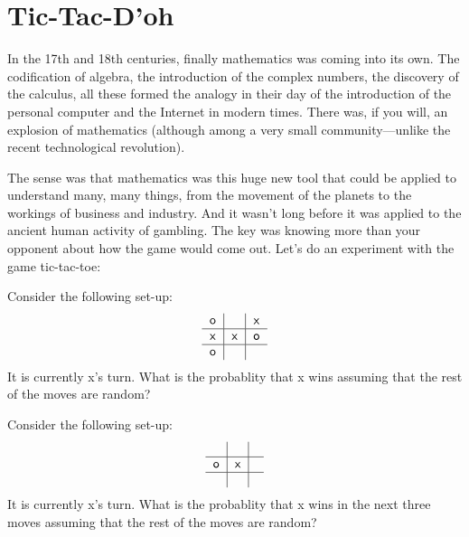 \newpage
\section{Tic-Tac-D'oh}

In the 17th and 18th centuries, finally mathematics was coming into
its own.  The codification of algebra, the introduction of the complex
numbers, the discovery of the calculus, all these formed the analogy
in their day of the introduction of the personal computer and the
Internet in modern times.  There was, if you will, an explosion of
mathematics (although among a very small community---unlike the recent
technological revolution).

The sense was that mathematics was this huge new tool that could be
applied to understand many, many things, from the movement of the
planets to the workings of business and industry.  And it wasn't long
before it was applied to the ancient human activity of gambling.  The
key was knowing more than your opponent about how the game would come
out.  Let's do an experiment with the game tic-tac-toe:

\begin{prob}
Consider the following set-up:
\[
\textsf{\begin{tabular}{c|c|c}
o & & x \\ \hline
x & x & o\\ \hline
o &   & 
\end{tabular}}
\]
It is currently \textsf{x}'s turn. What is the probablity
that \textsf{x} wins assuming that the rest of the moves are random?
\end{prob}


\begin{prob}
Consider the following set-up:
\[
\textsf{\begin{tabular}{c|c|c}
  & &  \\ \hline
o & x & \\ \hline
 &   & 
\end{tabular}}
\]
It is currently \textsf{x}'s turn. What is the probablity
that \textsf{x} wins in the next three moves assuming that the rest of
the moves are random?
\end{prob}

